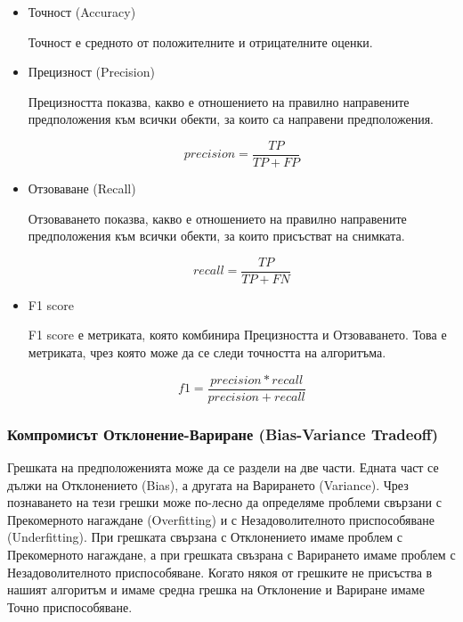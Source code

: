 \documentclass{article}
\begin{document}
\begin{itemize}

  \item Точност (Accuracy)

  Точност е средното от положителните и отрицателните оценки.

  \item Прецизност (Precision)

  Прецизността показва, какво е отношението на правилно направените предположения към всички обекти, за които са
  направени предположения.

  \begin{equation}
    precision = \frac{TP}{TP + FP}
  \end{equation}

  \item Отзоваване (Recall)

  Отзоваването показва, какво е отношението на правилно направените предположения към всички обекти, за които
  присъстват на снимката.

  \begin{equation}
    recall = \frac{TP}{TP + FN}
  \end{equation}

  \item F1 score

  F1 score е метриката, която комбинира Прецизността и Отзоваването. Това е метриката, чрез която може да се следи
  точността на алгоритъма. \cite{metrics}

  \begin{equation}
    f1 = \frac{precision * recall}{precision + recall}
  \end{equation}

\end{itemize}

\subsubsection{Компромисът Отклонение-Вариране (Bias-Variance Tradeoff)}

Грешката на предположенията може да се раздели на две части. Едната част се дължи на Отклонението (Bias), а другата на
Варирането (Variance). Чрез познаването на тези грешки може по-лесно да определяме проблеми свързани с Прекомерното
нагаждане (Overfitting) и с Незадоволителното приспособяване (Underfitting). При грешката свързана с Отклонението имаме
проблем с Прекомерното нагаждане, а при грешката свъзрана с Варирането имаме проблем с Незадоволителното
приспособяване. Когато някоя от грешките не присъства в нашият алгоритъм и имаме средна грешка на Отклонение и Вариране
имаме Точно приспособяване. \cite{bias-variance}
\end{document}

